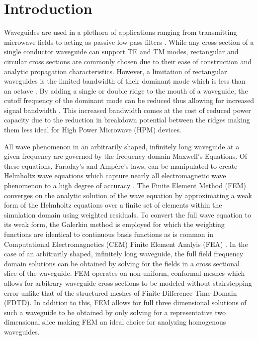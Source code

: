 \section{Introduction}
\label{sec:intro}

Waveguides are used in a plethora of applications ranging from transmitting microwave fields to acting as passive low-pass filters \cite{pozar2011microwave}. While any cross section of a single conductor waveguide can support TE and TM modes, rectangular and circular cross sections are commonly chosen due to their ease of construction and analytic propagation characteristics. However, a limitation of rectangular waveguides is the limited bandwidth of their dominant mode which is less than an octave \cite{pozar2011microwave}. By adding a single or double ridge to the mouth of a waveguide, the cutoff frequency of the dominant mode can be reduced thus allowing for increased signal bandwidth \cite{pozar2011microwave}. This increased bandwidth comes at the cost of reduced power capacity due to the reduction in breakdown potential between the ridges \cite{pozar2011microwave} making them less ideal for High Power Microwave (HPM) devices.  

All wave phenomenon in an arbitrarily shaped, infinitely long waveguide at a given frequency are governed by the frequency domain Maxwell's Equations. Of these equations, Faraday's and Amp\`{e}re's laws, can be manipulated to create Helmholtz wave equations which capture nearly all electromagnetic wave phenomenon to a high degree of accuracy \cite{rothlecnotes}. The Finite Element Method (FEM) converges on the analytic solution of the wave equation by approximating a weak form of the Helmholtz equations over a finite set of elements within the simulation domain using weighted residuals. To convert the full wave equation to its weak form, the Galerkin method is employed for which the weighting functions are identical to continuous basis functions as is common in Computational Electromagnetics (CEM) Finite Element Analyis (FEA) \cite{rothlecnotes}. In the case of an arbitrarily shaped, infinitely long waveguide, the full field frequency domain solutions can be obtained by solving for the fields in a cross sectional slice of the waveguide. FEM operates on non-uniform, conformal meshes which allows for arbitrary waveguide cross sections to be modeled without stairstepping error unlike that of the structured meshes of Finite-Difference Time-Domain (FDTD). In addition to this, FEM allows for full three dimensional solutions of such a waveguide to be obtained by only solving for a representative two dimensional slice making FEM an ideal choice for analyzing homogenous waveguides.

